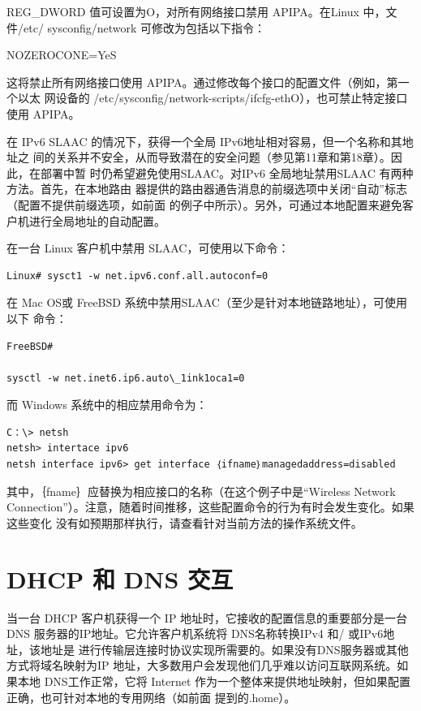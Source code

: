 REG\_DWORD 值可设置为O，对所有网络接口禁用 APIPA。在Linux 中，文件/etc/
sysconfig/network 可修改为包括以下指令：

NOZEROCONE=YeS

这将禁止所有网络接口使用 APIPA。通过修改每个接口的配置文件（例如，第一个以太
网设备的 /etc/sysconfig/network-scripts/ifcfg-ethO），也可禁止特定接口使用 APIPA。

在 IPv6 SLAAC 的情况下，获得一个全局 IPv6地址相对容易，但一个名称和其地址之
间的关系并不安全，从而导致潜在的安全问题（参见第11章和第18章）。因此，在部署中暂
时仍希望避免使用SLAAC。对IPv6 全局地址禁用SLAAC 有两种方法。首先，在本地路由
器提供的路由器通告消息的前缀选项中关闭“自动”标志（配置不提供前缀选项，如前面
的例子中所示）。另外，可通过本地配置来避免客户机进行全局地址的自动配置。

在一台 Linux 客户机中禁用 SLAAC，可使用以下命令：

\begin{verbatim}    
Linux# sysct1 -w net.ipv6.conf.all.autoconf=0
\end{verbatim}

在 Mac OS或 FreeBSD 系统中禁用SLAAC（至少是针对本地链路地址），可使用以下
命令：

\begin{verbatim}
FreeBSD#

sysctl -w net.inet6.ip6.auto\_1ink1oca1=0
\end{verbatim}
而 Windows 系统中的相应禁用命令为：

\begin{verbatim}
C：\> netsh
netsh> intertace ipv6
netsh interface ipv6> get interface ｛ifname｝managedaddress=disabled
\end{verbatim}

其中，｛fname｝应替换为相应接口的名称（在这个例子中是“Wireless Network
Connection”）。注意，随着时间推移，这些配置命令的行为有时会发生变化。如果这些变化
没有如预期那样执行，请查看针对当前方法的操作系统文件。

\section{DHCP 和 DNS 交互}
当一台 DHCP 客户机获得一个 IP 地址时，它接收的配置信息的重要部分是一台 DNS
服务器的IP地址。它允许客户机系统将 DNS名称转换IPv4 和/ 或IPv6地址，该地址是
进行传输层连接时协议实现所需要的。如果没有DNS服务器或其他方式将域名映射为IP
地址，大多数用户会发现他们几乎难以访问互联网系统。如果本地 DNS工作正常，它将
Internet 作为一个整体来提供地址映射，但如果配置正确，也可针对本地的专用网络（如前面
提到的.home）。

